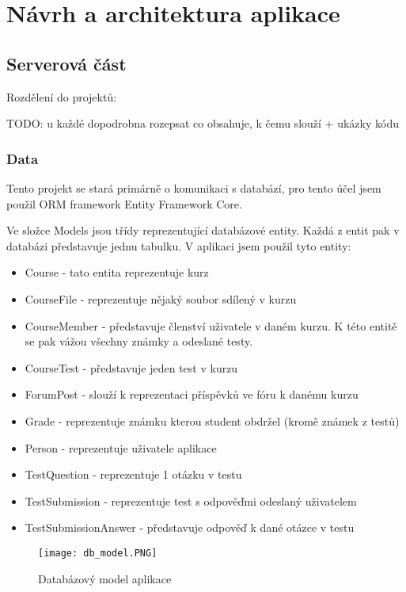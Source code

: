 \chapter{Návrh a architektura aplikace}

\section{Serverová část}

Rozdělení do projektů:

TODO: u každé dopodrobna rozepsat co obsahuje, k čemu slouží + ukázky kódu

\subsection{Data}

Tento projekt se stará primárně o komunikaci s databází, pro tento účel jsem použil ORM framework Entity Framework Core. 

Ve složce Models jsou třídy reprezentující databázové entity. Každá z entit pak v databázi představuje jednu tabulku. V aplikaci jsem použil tyto entity:

\begin{itemize}
	\item Course - tato entita reprezentuje kurz
	\item CourseFile - reprezentuje nějaký soubor sdílený v kurzu
	\item CourseMember - představuje členství uživatele v daném kurzu. K této entitě se pak vážou všechny známky a odeslané testy.
	\item CourseTest - představuje jeden test v kurzu
	\item ForumPost - slouží k reprezentaci příspěvků ve fóru k danému kurzu
	\item Grade - reprezentuje známku kterou student obdržel (kromě známek z testů)
	\item Person - reprezentuje uživatele aplikace
	\item TestQuestion - reprezentuje 1 otázku v testu
	\item TestSubmission - reprezentuje test s odpověďmi odeslaný uživatelem
	\item TestSubmissionAnswer - představuje odpověď k dané otázce v testu
\end{itemize}

\newpage

\begin{figure}
	\centering
	\texttt{[image: db\_model.PNG]}
	\caption{Databázový model aplikace}
\end{figure}

